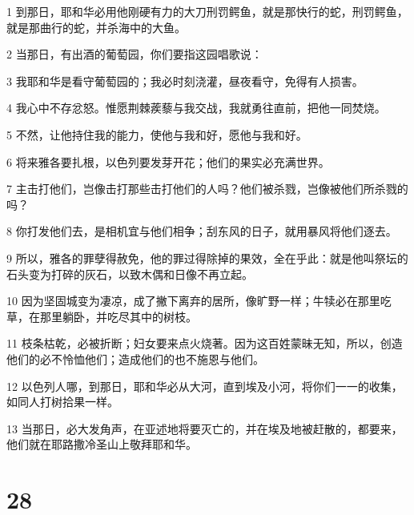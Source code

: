 \par 1 到那日，耶和华必用他刚硬有力的大刀刑罚鳄鱼，就是那快行的蛇，刑罚鳄鱼，就是那曲行的蛇，并杀海中的大鱼。
\par 2 当那日，有出酒的葡萄园，你们要指这园唱歌说：
\par 3 我耶和华是看守葡萄园的；我必时刻浇灌，昼夜看守，免得有人损害。
\par 4 我心中不存忿怒。惟愿荆棘蒺藜与我交战，我就勇往直前，把他一同焚烧。
\par 5 不然，让他持住我的能力，使他与我和好，愿他与我和好。
\par 6 将来雅各要扎根，以色列要发芽开花；他们的果实必充满世界。
\par 7 主击打他们，岂像击打那些击打他们的人吗？他们被杀戮，岂像被他们所杀戮的吗？
\par 8 你打发他们去，是相机宜与他们相争；刮东风的日子，就用暴风将他们逐去。
\par 9 所以，雅各的罪孽得赦免，他的罪过得除掉的果效，全在乎此：就是他叫祭坛的石头变为打碎的灰石，以致木偶和日像不再立起。
\par 10 因为坚固城变为凄凉，成了撇下离弃的居所，像旷野一样；牛犊必在那里吃草，在那里躺卧，并吃尽其中的树枝。
\par 11 枝条枯乾，必被折断；妇女要来点火烧著。因为这百姓蒙昧无知，所以，创造他们的必不怜恤他们；造成他们的也不施恩与他们。
\par 12 以色列人哪，到那日，耶和华必从大河，直到埃及小河，将你们一一的收集，如同人打树拾果一样。
\par 13 当那日，必大发角声，在亚述地将要灭亡的，并在埃及地被赶散的，都要来，他们就在耶路撒冷圣山上敬拜耶和华。

\chapter{28}

